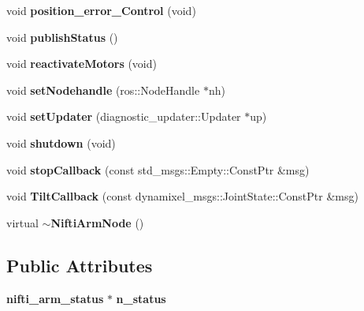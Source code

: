 \begin{DoxyCompactItemize}
\item 
void {\bf position\-\_\-error\-\_\-\-Control} (void)
\item 
void {\bf publish\-Status} ()
\item 
void {\bf reactivate\-Motors} (void)
\item 
void {\bf set\-Nodehandle} (ros\-::\-Node\-Handle $\ast$nh)
\item 
void {\bf set\-Updater} (diagnostic\-\_\-updater\-::\-Updater $\ast$up)
\item 
void {\bf shutdown} (void)
\item 
void {\bf stop\-Callback} (const std\-\_\-msgs\-::\-Empty\-::\-Const\-Ptr \&msg)
\item 
void {\bf \-Tilt\-Callback} (const dynamixel\-\_\-msgs\-::\-Joint\-State\-::\-Const\-Ptr \&msg)
\item 
virtual {\bf $\sim$\-Nifti\-Arm\-Node} ()
\end{DoxyCompactItemize}
\subsection*{\-Public \-Attributes}
\begin{DoxyCompactItemize}
\item 
{\bf nifti\-\_\-arm\-\_\-status} $\ast$ {\bf n\-\_\-status}
\end{DoxyCompactItemize}
